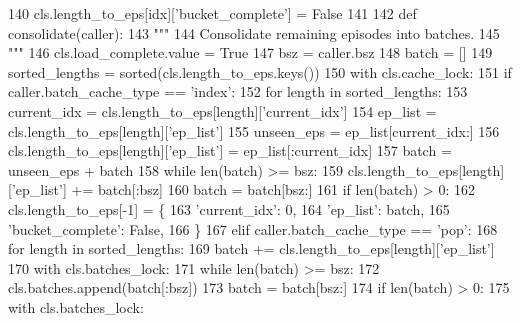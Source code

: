 \begin{DoxyCode}
140                     cls.length\_to\_eps[idx][\textcolor{stringliteral}{'bucket\_complete'}] = \textcolor{keyword}{False}
141 
142         \textcolor{keyword}{def }consolidate(caller):
143             \textcolor{stringliteral}{"""}
144 \textcolor{stringliteral}{            Consolidate remaining episodes into batches.}
145 \textcolor{stringliteral}{            """}
146             cls.load\_complete.value = \textcolor{keyword}{True}
147             bsz = caller.bsz
148             batch = []
149             sorted\_lengths = sorted(cls.length\_to\_eps.keys())
150             with cls.cache\_lock:
151                 \textcolor{keywordflow}{if} caller.batch\_cache\_type == \textcolor{stringliteral}{'index'}:
152                     \textcolor{keywordflow}{for} length \textcolor{keywordflow}{in} sorted\_lengths:
153                         current\_idx = cls.length\_to\_eps[length][\textcolor{stringliteral}{'current\_idx'}]
154                         ep\_list = cls.length\_to\_eps[length][\textcolor{stringliteral}{'ep\_list'}]
155                         unseen\_eps = ep\_list[current\_idx:]
156                         cls.length\_to\_eps[length][\textcolor{stringliteral}{'ep\_list'}] = ep\_list[:current\_idx]
157                         batch = unseen\_eps + batch
158                         \textcolor{keywordflow}{while} len(batch) >= bsz:
159                             cls.length\_to\_eps[length][\textcolor{stringliteral}{'ep\_list'}] += batch[:bsz]
160                             batch = batch[bsz:]
161                     \textcolor{keywordflow}{if} len(batch) > 0:
162                         cls.length\_to\_eps[-1] = \{
163                             \textcolor{stringliteral}{'current\_idx'}: 0,
164                             \textcolor{stringliteral}{'ep\_list'}: batch,
165                             \textcolor{stringliteral}{'bucket\_complete'}: \textcolor{keyword}{False},
166                         \}
167                 \textcolor{keywordflow}{elif} caller.batch\_cache\_type == \textcolor{stringliteral}{'pop'}:
168                     \textcolor{keywordflow}{for} length \textcolor{keywordflow}{in} sorted\_lengths:
169                         batch += cls.length\_to\_eps[length][\textcolor{stringliteral}{'ep\_list'}]
170                     with cls.batches\_lock:
171                         \textcolor{keywordflow}{while} len(batch) >= bsz:
172                             cls.batches.append(batch[:bsz])
173                             batch = batch[bsz:]
174                     \textcolor{keywordflow}{if} len(batch) > 0:
175                         with cls.batches\_lock:

\end{DoxyCode}
